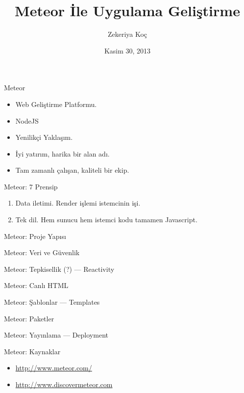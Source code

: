 \documentclass{beamer}
\title[Meteor 101]{Meteor \.{I}le Uygulama Geli\c{s}tirme}
\author{Zekeriya Ko\c{c}}
\institute{Metglobal}
\date{Kasim 30, 2013}
\begin{document}
    \begin{frame}
        \titlepage{}
    \end{frame}

    \begin{frame}{Meteor}
        \begin{itemize}
            \item Web Geliştirme Platformu.
            \item NodeJS
            \item Yenilikçi Yaklaşım.
            \item İyi yatırım, harika bir alan adı.
            \item Tam zamanlı çalışan, kaliteli bir ekip.
        \end{itemize}
    \end{frame}

    \begin{frame}{Meteor: 7 Prensip}
        \begin{enumerate}
            \item Data iletimi. Render işlemi istemcinin işi.
            \item Tek dil. Hem sunucu hem istemci kodu tamamen Javascript.
        \end{enumerate}
    \end{frame}

    \begin{frame}{Meteor: Proje Yap{\i}s{\i}}
    \end{frame}

    \begin{frame}{Meteor: Veri ve G\"uvenlik}
    \end{frame}

    \begin{frame}{Meteor: Tepkisellik (?) --- Reactivity}
    \end{frame}

    \begin{frame}{Meteor: Canl{\i} HTML}
    \end{frame}

    \begin{frame}{Meteor: \c{S}ablonlar --- Templates}
    \end{frame}

    \begin{frame}{Meteor: Paketler}
    \end{frame}

    \begin{frame}{Meteor: Yay{\i}nlama --- Deployment}
    \end{frame}

    \begin{frame}{Meteor: Kaynaklar}
        \begin{itemize}
            \item \url{http://www.meteor.com/}
            \item \url{http://www.discovermeteor.com}
        \end{itemize}
    \end{frame}
\end{document}
